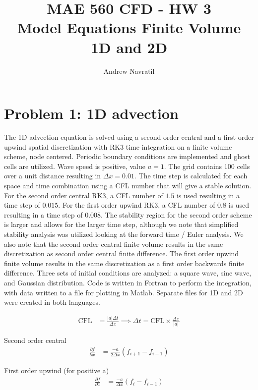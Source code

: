 \documentclass[conf]{new-aiaa}
\title{MAE 560 CFD - HW 3\\Model Equations Finite Volume\\1D and 2D}
\author{Andrew Navratil}
\begin{document}
\maketitle

\section*{Problem 1: 1D advection}

The 1D advection equation is solved using a second order central and a first order upwind spatial discretization with RK3 time integration on a finite volume scheme, node centered.  Periodic boundary conditions are implemented and ghost cells are utilized.  Wave speed is positive, value $a=1$.  The grid contains 100 cells over a unit distance resulting in $\Delta x = 0.01$.  The time step is calculated for each space and time combination using a CFL number that will give a stable solution. For the second order central RK3, a CFL number of $1.5$ is used resulting in a time step of $0.015$.  For the first order upwind RK3, a CFL number of $0.8$ is used resulting in a time step of $0.008$.  The stability region for the second order scheme is larger and allows for the larger time step, although we note that simplified stability analysis was utilized looking at the forward time / Euler analysis.  We also note that the second order central finite volume results in the same discretization as second order central finite difference.  The first order upwind finite volume results in the same discretization as a first order backwards finite difference.  Three sets of initial conditions are analyzed: a square wave, sine wave, and Gaussian distribution.  Code is written in Fortran to perform the integration, with data written to a file for plotting in Matlab.  Separate files for 1D and 2D were created in both languages.

\begin{align*}
	\text{CFL} &= \frac{|a|\Delta t}{\Delta x} \implies \Delta t = \text{CFL} \times \frac{\Delta x}{|a|}
\end{align*}

Second order central
\begin{align*}
	\frac{\partial f}{\partial x} &= \frac{-a}{2\Delta x} (f_{i+1} - f_{i-1})
\end{align*}

First order upwind (for positive a)
\begin{align*}
	\frac{\partial f}{\partial x} &= \frac{-a}{\Delta x} (f_{i} - f_{i-1})
\end{align*}
\end{document}
